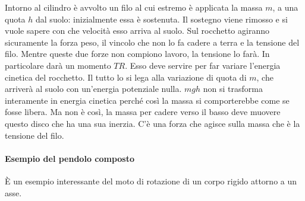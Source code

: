 \begin{figure}[htpb]
\end{figure}
\FloatBarrier
Intorno al cilindro è avvolto un filo al cui estremo è applicata la massa $m$, a una quota $h$ dal suolo: inizialmente essa è sostenuta. Il sostegno viene rimosso e si vuole sapere con che velocità esso arriva al suolo.
Sul rocchetto agiranno sicuramente la forza peso, il vincolo che non lo fa cadere a terra e la tensione del filo. Mentre queste due forze non compiono lavoro, la tensione lo farà. In particolare darà un momento $TR$. Esso deve servire per far variare l'energia cinetica del rocchetto. Il tutto lo si lega alla variazione di quota di $m$, che arriverà al suolo con un'energia potenziale nulla. $mgh$ non si trasforma interamente in energia cinetica perché così la massa si comporterebbe come se fosse libera. Ma non è così, la massa per cadere verso il basso deve muovere questo disco che ha una sua inerzia. C'è una forza che agisce sulla massa che è la tensione del filo.

\paragraph{Esempio del pendolo composto} È un esempio interessante del moto di rotazione di un corpo rigido attorno a un asse.

